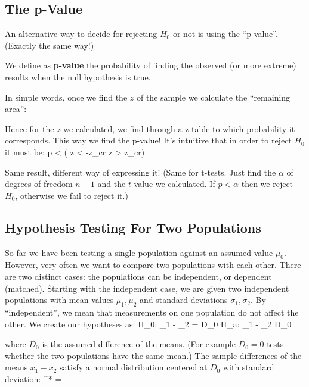 \subsection{The p-Value}

An alternative way to decide for rejecting $H_{0}$ or not is using the ``p-value''. (Exactly the same way!)

\bd[p-Value]
We define as \textbf{p-value} the probability of finding the observed (or more extreme) results when the null
hypothesis is true.
\ed

In simple words, once we find the $z$ of the sample we calculate the ``remaining area'':


Hence for the $z$ we calculated, we find through a z-table to which probability it corresponds. This way we find
the p-value! It's intuitive that in order to reject $H_{0}$ it must be:
\bse
p < \alpha \qquad ( \:\: z < -z_{cr} \:\:  \:\: z > z_{cr})
\ese

Same result, different way of expressing it! (Same for t-tests. Just find the $\alpha$ of degrees of freedom $n-1$
and the $t$-value we calculated. If $p < \alpha$ then we reject $H_{0}$, otherwise we fail to reject it.)

\subsection{Hypothesis Testing For Two Populations}

So far we have been testing a single population against an assumed value $\mu_{0}$. However, very often we want to
compare two populations with each other. There are two distinct cases: the populations can be independent, or
dependent (matched). \v

Starting with the independent case, we are given two independent populations with mean values $\mu_{1}, \mu_{2}$
and standard deviations $\sigma_{1}, \sigma_{2}$. By ``independent'', we mean that measurements on one population
do not affect the other. We create our hypotheses as:
\bse
H_{0}: \mu_{1} - \mu_{2} = D_{0} \qquad \qquad H_{a}: \mu_{1} - \mu_{2} \neq D_{0}
\ese

where $D_{0}$ is the assumed difference of the means. (For example $D_{0} = 0$ tests whether the two populations
have the same mean.) The sample differences of the means $\bar{x}_{1} - \bar{x}_{2}$ satisfy a normal distribution
centered at $D_{0}$ with standard deviation:
\bse
\sigma^{*} = 
\ese

